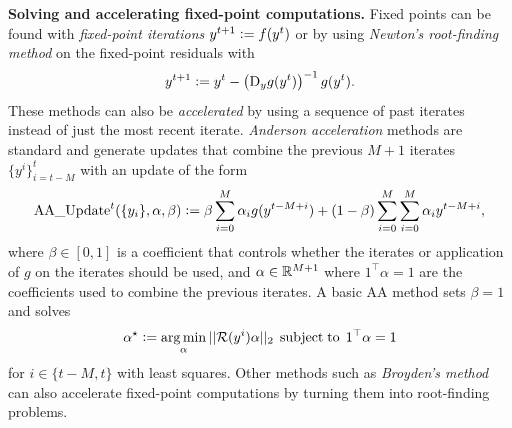\documentclass[twoside,11pt]{article}
\begin{document}
\textbf{Solving and accelerating fixed-point computations.}
Fixed points can be found with \emph{fixed-point iterations}
$y^{t+1}\vcentcolon= f(y^t)$ or by using
\emph{Newton's root-finding method} on the
fixed-point residuals with
\begin{equation}
  y^{t+1}\vcentcolon= y^t - \left(\mathrm{D}_y g(y^t)\right)^{-1} g(y^t).
  \label{eq:newton}
\end{equation}
These methods can also be \emph{accelerated} by using
a sequence of past iterates instead of just the most
recent iterate.
\emph{Anderson acceleration} methods
\citep{anderson1965iterative,walker2011anderson,zhang2020globally}
are standard and generate updates that combine the
previous $M+1$ iterates $\{y^i\}_{i=t-M}^t$  with an update of the form
\begin{equation}
  \label{eq:aa-update}
  {\rm AA\_Update}^t(\{y_i\}, \alpha, \beta) \vcentcolon=
  \beta \sum_{i=0}^M \alpha_i g(y^{t-M+i}) +
  (1-\beta)\sum_{i=0}^M\sum_{i=0}^M \alpha_i y^{t-M+i},
\end{equation}
where $\beta\in[0,1]$ is a coefficient that controls
whether the iterates or application of $g$ on the iterates
should be used, and $\alpha\in\mathbb{R}^{M+1}$ where $1^\top\alpha=1$
are the coefficients used to combine the previous iterates.
A basic AA method sets $\beta=1$ and solves
\begin{equation}
  \label{eq:aa-alpha}
  \alpha^\star\vcentcolon= \operatorname*{arg\,min}_\alpha ||{\mathcal{R}}(y^i)\alpha||_2\; \operatorname*{subject\;to}\; 1^\top \alpha = 1
\end{equation}
for $i\in\{t-M,t\}$ with least squares.
Other methods such as
\emph{Broyden's method} \citep{broyden1965class} can
also accelerate fixed-point computations by turning them
into root-finding problems.
\end{document}
